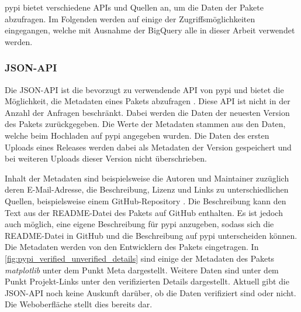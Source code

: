 \gls{pypi} bietet verschiedene APIs und Quellen an, um die Daten der Pakete abzufragen.
Im Folgenden werden auf einige der Zugriffsmöglichkeiten eingegangen, welche mit Ausnahme der BigQuery alle in dieser Arbeit verwendet werden.

\subsubsection*{JSON-API}
\label{subsubsec:pypi_json_api}
Die JSON-API ist die bevorzugt zu verwendende API von \gls{pypi} und bietet die Möglichkeit, die Metadaten eines Pakets abzufragen \autocite{python_software_foundation_warehouse_2024}.
Diese API ist nicht in der Anzahl der Anfragen beschränkt.
Dabei werden die Daten der neuesten Version des Pakets zurückgegeben.
Die Werte der Metadaten stammen aus den Daten, welche beim Hochladen auf \gls{pypi} angegeben wurden.
Die Daten des ersten Uploads eines Releases werden dabei als Metadaten der Version gespeichert und bei weiteren Uploads dieser Version nicht überschrieben.

Inhalt der Metadaten sind beispielsweise die Autoren und Maintainer zuzüglich deren E-Mail-Adresse, die Beschreibung, Lizenz und Links zu unterschiedlichen Quellen, beispielsweise einem GitHub-Repository \autocite{python_software_foundation_warehouse_2024}.
Die Beschreibung kann den Text aus der README-Datei des Pakets auf GitHub enthalten.
Es ist jedoch auch möglich, eine eigene Beschreibung für \gls{pypi} anzugeben, sodass sich die README-Datei in GitHub und die Beschreibung auf \gls{pypi} unterscheiden können.
Die Metadaten werden von den Entwicklern des Pakets eingetragen.
In \autoref{fig:pypi_verified_unverified_details} sind einige der Metadaten des Pakets \emph{matplotlib} unter dem Punkt \glqq Meta\grqq{} dargestellt.
Weitere Daten sind unter dem Punkt \glqq Projekt-Links\grqq{} unter den verifizierten Details dargestellt.
Aktuell gibt die JSON-API noch keine Auskunft darüber, ob die Daten verifiziert sind oder nicht.
Die Weboberfläche stellt dies bereits dar.

